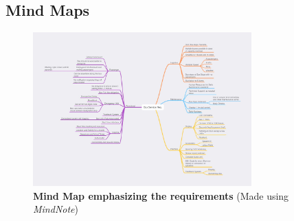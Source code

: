 \pagestyle{uselscape}
\begin{landscapes}
\section{Mind Maps}
\begin{center}
    \begin{figure}[H]
        \centering
        \includegraphics[width=0.75\textwidth,trim={1cm 2cm 0cm 2cm}, clip]{./Files/Images/MindMap.jpg}
        \caption[\textbf{Mind Map emphasizing the requirements}]{\textbf{Mind Map emphasizing the requirements} (Made using \textit{MindNote})}
    \end{figure}
\end{center}
\end{landscapes}
